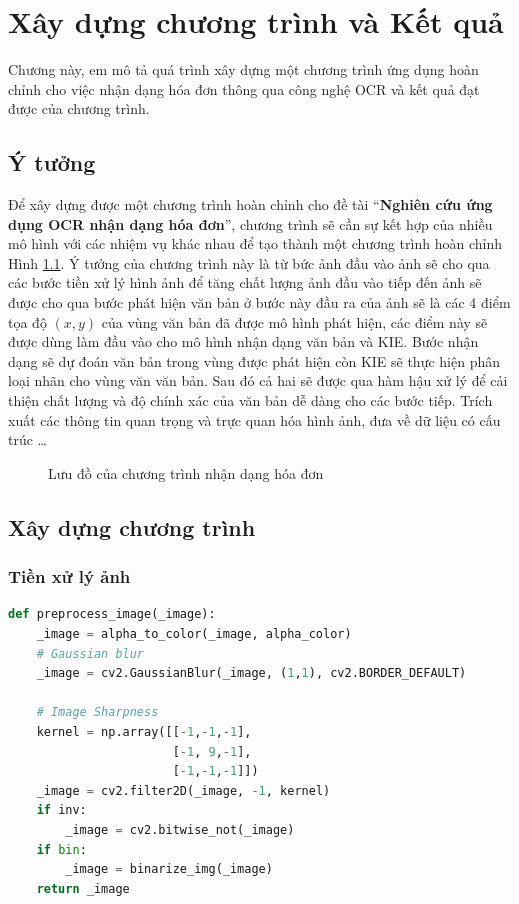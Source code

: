 \chapter{Xây dựng chương trình và Kết quả} \label{build_and_result}

Chương này, em mô tả quá trình xây dựng một chương trình ứng dụng hoàn chỉnh cho việc nhận dạng hóa đơn thông qua công nghệ OCR và kết quả đạt được của chương trình.
\section{Ý tưởng}
Để xây dựng được một chương trình hoàn chỉnh cho đề tài ``\textbf{Nghiên cứu ứng dụng OCR nhận dạng hóa đơn}'', chương trình sẽ cần sự kết hợp của nhiều mô hình với các nhiệm vụ khác nhau để tạo thành một chương trình hoàn chỉnh Hình \ref{pipeline}. Ý tưởng của chương trình này là từ bức ảnh đầu vào ảnh sẽ cho qua các bước tiền xử lý hình ảnh để tăng chất lượng ảnh đầu vào tiếp đến ảnh sẽ được cho qua bước phát hiện văn bản ở bước này đầu ra của ảnh sẽ là các 4 điểm tọa độ $(x, y)$ của vùng văn bản đã được mô hình phát hiện, các điểm này sẽ được dùng làm đầu vào cho mô hình nhận dạng văn bản và KIE. Bước nhận dạng sẽ dự đoán văn bản trong vùng được phát hiện còn KIE sẽ thực hiện phân loại nhãn cho vùng văn văn bản. Sau đó cả hai sẽ được qua hàm hậu xử lý để cải thiện chất lượng và độ chính xác của văn bản dễ dàng cho các bước tiếp. Trích xuất các thông tin quan trọng và trực quan hóa hình ảnh, đưa về dữ liệu có cấu trúc \ldots
\begin{figure}
    
    \centering
    \caption{Lưu đồ của chương trình nhận dạng hóa đơn}
    \label{pipeline}
\end{figure}

\newpage
\section{Xây dựng chương trình}
\subsection{Tiền xử lý ảnh}

\begin{lstlisting}[language=Python]
def preprocess_image(_image):
    _image = alpha_to_color(_image, alpha_color)
    # Gaussian blur
    _image = cv2.GaussianBlur(_image, (1,1), cv2.BORDER_DEFAULT)

    # Image Sharpness
    kernel = np.array([[-1,-1,-1], 
                       [-1, 9,-1], 
                       [-1,-1,-1]])
    _image = cv2.filter2D(_image, -1, kernel)
    if inv:
        _image = cv2.bitwise_not(_image)
    if bin:
        _image = binarize_img(_image)
    return _image  
\end{lstlisting}

